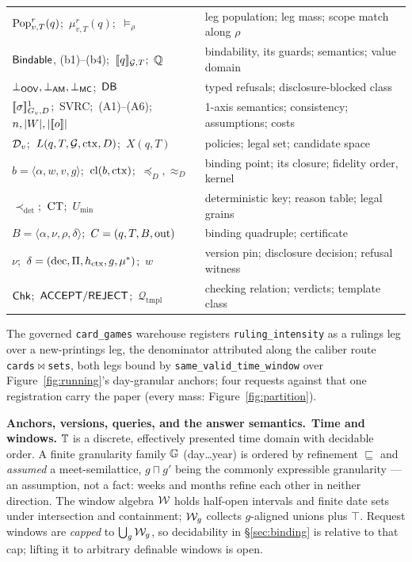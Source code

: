 \begin{table}[t]
\begin{tabular}{@{}ll@{}}
$\mathrm{Pop}^{r}_{v,T}(q)$;\ $\mu^{r}_{v,T}(q)$;\ $\models_\rho$ &
  leg population; leg mass; scope match along $\rho$\\
$\mathsf{Bindable}$, (b1)--(b4);\ $[\![q]\!]_{\mathcal{G},T}$;\ $\mathbb{Q}$ &
  bindability, its guards; semantics; value domain\\
$\bot_{\mathsf{OOV}},\bot_{\mathsf{AM}},\bot_{\mathsf{MC}}$;\ $\mathsf{DB}$ &
  typed refusals; disclosure-blocked class\\
$[\![\sigma]\!]^1_{G_v,D}$;\ SVRC;\ (A1)--(A6);\ $n,|W|,|[\![o]\!]|$ &
  1-axis semantics; consistency; assumptions; costs\\
$\mathcal{D}_v$;\ $L(q,T,\mathcal{G},\mathrm{ctx},D)$;\ $X(q,T)$ &
  policies; legal set; candidate space\\
$b=\langle\alpha,w,v,g\rangle$;\ $\mathrm{cl}(b,\mathrm{ctx})$;\ $\preceq_D,\approx_D$ &
  binding point; its closure; fidelity order, kernel\\
$\prec_{\det}$;\ $\mathrm{CT}$;\ $U_{\min}$ &
  deterministic key; reason table; legal grains\\
$B=\langle\alpha,\nu,\rho,\delta\rangle$;\ $C=(q,T,B,\mathrm{out})$ &
  binding quadruple; certificate\\
$\nu$;\ $\delta=(\mathrm{dec},\Pi,h_{\mathrm{ctx}},g,\mu^*)$;\ $w$ &
  version pin; disclosure decision; refusal witness\\
$\mathsf{Chk}$;\ $\mathsf{ACCEPT}/\mathsf{REJECT}$;\ $\mathcal{Q}_{\mathrm{tmpl}}$ &
  checking relation; verdicts; template class\\
\bottomrule
\end{tabular}
\end{table}

\begin{example}
\label{ex:run}
 The governed \texttt{card\_games} warehouse registers
\texttt{ruling\_\allowbreak intensity} as a rulings leg over a new-printings
leg, the denominator attributed along the caliber
route \texttt{cards}$\bowtie$\texttt{sets}, both legs bound by
\texttt{same\_\allowbreak valid\_\allowbreak time\_\allowbreak window} over
Figure~\ref{fig:running}'s day-granular anchors; four requests against that
one registration carry the paper (every mass:
Figure~\ref{fig:partition}).
\end{example}

\smallskip\noindent{}\textbf{Anchors, versions, queries, and the answer
semantics.}\label{sec:sem:graph}\label{sec:sem:bracket}\label{sec:sem:fail}\
\textbf{Time and windows.} $\mathbb{T}$ is a discrete, effectively presented
time domain with decidable order. A
finite granularity family $\mathbb{G}$ (day\dots year) is ordered by refinement
$\sqsubseteq$ and \emph{assumed} a meet-semilattice, $g\sqcap g'$ being the
commonly expressible granularity --- an assumption, not a fact: weeks and months
refine each other in neither direction. The window algebra $\mathcal{W}$ holds
half-open intervals and finite date sets under intersection and containment;
$\mathcal{W}_g$ collects $g$-aligned unions plus $\top$. Request windows are
\emph{capped} to $\bigcup_g\mathcal{W}_g$, so decidability in \S\ref{sec:binding} is
relative to that cap; lifting it to arbitrary definable windows is open.

